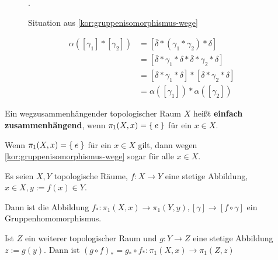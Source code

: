 \begin{figure}[htp]
    \centering
    
    \caption{Situation aus \cref{kor:gruppenisomorphismus-wege}}.
    \label{fig:situation-gruppenisomorphismus-wege}
\end{figure}

\begin{beweis}
    \begin{align*}
        \alpha([\gamma_1] * [\gamma_2]) &= [\overline{\delta} * (\gamma_1 * \gamma_2) * \delta]\\
        &= [\overline{\delta} * \gamma_1 * \delta * \overline{\delta} * \gamma_2 * \delta]\\
        &= [\overline{\delta} * \gamma_1 * \delta] * [\overline{\delta} * \gamma_2 * \delta]\\
        &= \alpha([\gamma_1]) * \alpha([\gamma_2])
    \end{align*}
\end{beweis}

\begin{definition}%
    Ein wegzusammenhängender topologischer Raum $X$ heißt
    \textbf{einfach zusammenhängend}, wenn $\pi_1(X,x) = \Set{e}$
    für ein $x \in X$.
\end{definition}

Wenn $\pi_1(X,x) = \Set{e}$ für ein $x \in X$ gilt, dann wegen 
\cref{kor:gruppenisomorphismus-wege} sogar für alle $x \in X$.

\begin{bemerkung}\label{korr:11.5}
    Es seien $X, Y$ topologische Räume, $f:X \rightarrow Y$ eine
    stetige Abbildung, $x \in X, y := f(x) \in Y$.

    \begin{bemenum}
        \item Dann ist die Abbildung $f_* : \pi_1(X,x) \rightarrow \pi_1(Y, y),
        [\gamma] \rightarrow [f \circ \gamma]$ ein Gruppenhomomorphismus.
        \item Ist $Z$ ein weiterer topologischer Raum und $g: Y \rightarrow Z$
              eine stetige Abbildung $z:= g(y)$. Dann ist
              $(g \circ f)_* = g_* \circ f_*: \pi_1(X,x) \rightarrow \pi_1(Z,z)$
    \end{bemenum}
\end{bemerkung}

